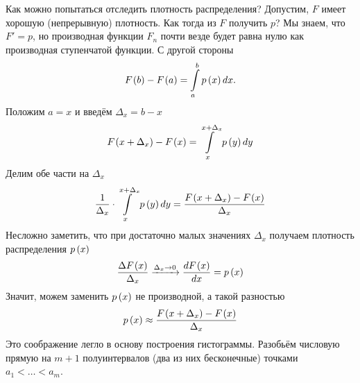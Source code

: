 Как можно попытаться отследить плотность распределения?
Допустим, $F$ имеет хорошую (непрерывную) плотность.
Как тогда из $F$ получить $p$?
Мы знаем, что $F'=p$, но производная функции $F_n$ почти везде будет равна нулю
как производная ступенчатой функции.
С другой стороны
\begin{equation*}
  F_{}\left(b\right)-F_{}\left(a\right)=\int\limits_a^b p\left(x\right) dx.
\end{equation*}
Положим $a=x$ и введём $\Delta_x=b-x$
$$F_{}\left(x+\Delta_x\right)-F_{}\left(x\right)=\int\limits_x^{x+\Delta_x} p\left(y\right) dy$$
Делим обе части на $\Delta_x$
\begin{equation*}
  \frac{1}{\Delta_x}\cdot\int\limits_x^{x+\Delta_x} p\left(y\right) dy
   = \frac{F_{}\left(x+\Delta_x\right)-F_{}\left(x\right)}{\Delta_x}
\end{equation*}
Несложно заметить, что при достаточно малых значениях $\Delta_x$
получаем плотность распределения $p\left(x\right)$
\begin{equation*}
  \frac{\Delta F_{}\left(x\right)}{\Delta_x} \xrightarrow[]{\Delta_x\to 0}
    \frac{dF_{}\left(x\right)}{dx}
  =p\left(x\right)
\end{equation*}
Значит, можем заменить $p\left(x\right)$ не производной, а такой разностью
\begin{equation*}
  p\left(x\right)\approx\frac{F_{}\left(x+\Delta_x\right)-F_{}\left(x\right)}{\Delta_x}
\end{equation*}
Это соображение легло в основу построения гистограммы.
Разобьём числовую прямую на $m+1$ полуинтервалов (два из них бесконечные)
точками $a_1 < \dots < a_m$.
\begin{comment}
Возьмём $m$ полуинтервалов на числовой прямой
$I_j=\left(a_{j-1},a_j\right], i=\overline{1,m}$
таких, каждое значение выборки попадает в свой интервал.
Для этого определим пару свойств точек, ограничивающих эти интервалы:
\begin{enumerate}
  \item Каждая следующая точка строго правее (больше) предыдущей
    (так как зачем нам одинаковые точки?)
    $$a_0<a_1<\dots<a_m$$
  \item Каждое значение выборки должно попадать ровно в один полуинтервал.
    Очевидно, что данные полуинтервалы $I_j$ не пересекаются между собой.
    Значит, осталось потребовать, чтобы
    крайнее левое значение было меньше минимального значения из выборки,
    а крайнее правое --- не меньше максимального
    $$a_0<min\left(X\right)\le max\left(X\right)\le a_m$$
\end{enumerate}

Введём функцию $q\left(y\right)$
$$q\left(y\right)
=\sum_{j=1}^m \frac{\cdf{a_j}-\cdf{a_{j-1}}}{a_j-a_{j-1}}
  \cdot\indicator{y\in I_j}$$
\end{comment}
